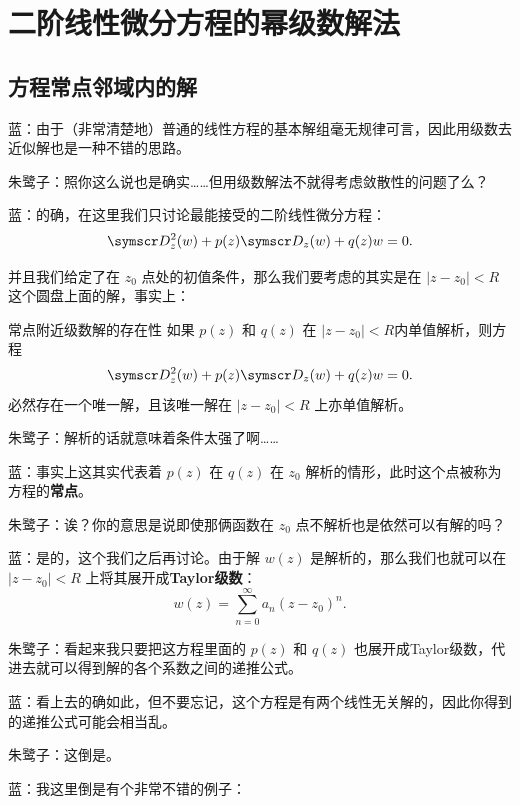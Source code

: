 \section{二阶线性微分方程的幂级数解法}

\subsection{方程常点邻域内的解}
蓝：由于（非常清楚地）普通的线性方程的基本解组毫无规律可言，因此用级数去近似解也是一种不错的思路。

朱鹭子：照你这么说也是确实……但用级数解法不就得考虑敛散性的问题了么？

蓝：的确，在这里我们只讨论最能接受的二阶线性微分方程：
\[
	\ddw+p(z)\dw+q(z)w=0
	.\]

并且我们给定了在 \(z_0\) 点处的初值条件，那么我们要考虑的其实是在 \(\left\vert z-z_0 \right\vert <R\) 这个圆盘上面的解，事实上：

\begin{tho}{常点附近级数解的存在性}{}
	如果 \(p(z)\) 和 \(q(z)\) 在 \(\left\vert z-z_0 \right\vert <R\)内单值解析，则方程
	\[
		\ddw+p(z)\dw+q(z)w=0
		.\]
	必然存在一个唯一解，且该唯一解在 \(\left\vert z-z_0 \right\vert <R\) 上亦单值解析。
\end{tho}
朱鹭子：解析的话就意味着条件太强了啊……

蓝：事实上这其实代表着 \(p(z)\) 在 \(q(z)\) 在 \(z_0\) 解析的情形，此时这个点被称为方程的\textbf{常点}。

朱鹭子：诶？你的意思是说即使那俩函数在 \(z_0\) 点不解析也是依然可以有解的吗？

蓝：是的，这个我们之后再讨论。由于解 \(w(z)\) 是解析的，那么我们也就可以在 \(\left\vert z-z_0 \right\vert <R\) 上将其展开成\textbf{Taylor级数}：
\[
	w(z)= \sum_{n=0}^{\infty} a_n(z-z_0)^n
	.\]

朱鹭子：看起来我只要把这方程里面的 \(p(z)\) 和 \(q(z)\) 也展开成Taylor级数，代进去就可以得到解的各个系数之间的递推公式。

蓝：看上去的确如此，但不要忘记，这个方程是有两个线性无关解的，因此你得到的递推公式可能会相当乱。

朱鹭子：这倒是。

蓝：我这里倒是有个非常不错的例子：


